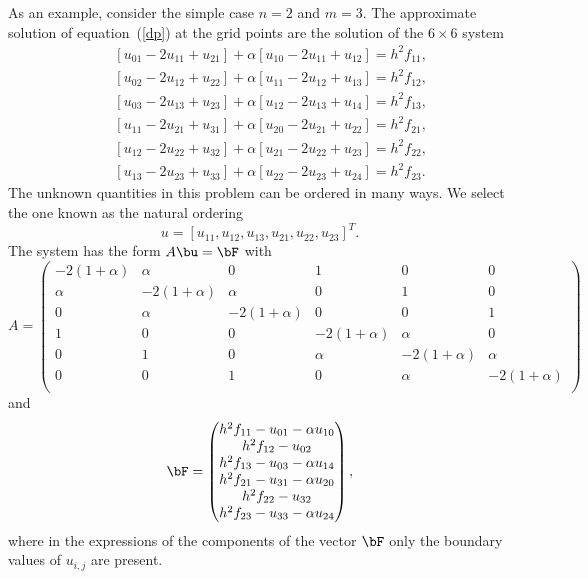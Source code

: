 As an example, consider the simple case $n=2$ and $m=3$.  The
approximate solution of equation~(\ref{dp}) at the grid points are the
solution of the $6\times 6$ system
%
\begin{eqnarray*}
  & & [u_{01}-2u_{11}+u_{21}]+\alpha[u_{10}-2u_{11}+u_{12}]=h^2f_{11},\\
  & & [u_{02}-2u_{12}+u_{22}]+\alpha[u_{11}-2u_{12}+u_{13}]=h^2f_{12},\\
  & & [u_{03}-2u_{13}+u_{23}]+\alpha[u_{12}-2u_{13}+u_{14}]=h^2f_{13},\\
  & & [u_{11}-2u_{21}+u_{31}]+\alpha[u_{20}-2u_{21}+u_{22}]=h^2f_{21},\\
  & & [u_{12}-2u_{22}+u_{32}]+\alpha[u_{21}-2u_{22}+u_{23}]=h^2f_{22},\\
  & & [u_{13}-2u_{23}+u_{33}]+\alpha[u_{22}-2u_{23}+u_{24}]=h^2f_{23}.
\end{eqnarray*}
%
The unknown quantities in this problem can be ordered in many ways. We
select the one known as the natural ordering
%
\begin{equation*}
  u=[u_{11},u_{12},u_{13},u_{21},u_{22},u_{23}]^T.
\end{equation*}
%
The system has the form $A \bu = \bF$ with
%
\begin{equation}
  A = \left ( \begin{array}{cccccc}
      -2 (1+\alpha) & \alpha & 0 & 1 & 0 & 0 \\
      \alpha & -2(1+\alpha) & \alpha & 0 & 1 & 0 \\
      0 & \alpha & -2(1+\alpha) & 0 & 0 & 1 \\
      1 & 0 & 0 & -2(1+\alpha) & \alpha & 0 \\
      0 & 1 & 0 & \alpha & -2(1+\alpha) & \alpha \\
      0 & 0 & 1 & 0 & \alpha & -2(1+\alpha) \\
    \end{array} \right ) \label{eq:PDE:A}
\end{equation}
%
and
%
\begin{equation*}
  \bF =
  \begin{pmatrix}
    h^2f_{11}- u_{01}-\alpha u_{10} \\
    h^2f_{12}- u_{02} \\
    h^2f_{13}- u_{03}-\alpha u_{14} \\
    h^2f_{21}- u_{31}-\alpha u_{20} \\
    h^2f_{22}- u_{32} \\
    h^2f_{23}- u_{33}-\alpha u_{24}
  \end{pmatrix},
\end{equation*}
%
where in the expressions of the components of the vector $\bF$ only
the boundary values of $u_{i,j}$ are present.

